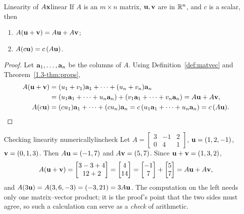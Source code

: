 \documentclass[11pt]{article}
\begin{document}
\begin{thm}{Linearity of $A\mathbf{x}$}{linear}
If $A$ is an $m\times n$ matrix, $\mathbf{u},\mathbf{v}$ are in $\mathbb{R}^n$, and $c$ is a scalar, then
\begin{enumerate}[label=(\alph*),itemsep=1pt]
  \item $A(\mathbf{u}+\mathbf{v})=A\mathbf{u}+A\mathbf{v}$;
  \item $A(c\mathbf{u})=c\,(A\mathbf{u})$.
\end{enumerate}
\end{thm}
 
\begin{proof}
Let $\mathbf{a}_1,\dots,\mathbf{a}_n$ be the columns of $A$. Using Definition~\ref{def:matvec} and Theorem~\ref{1.3-thm:props},
\begin{align*}
A(\mathbf{u}+\mathbf{v})&=(u_1+v_1)\mathbf{a}_1+\cdots+(u_n+v_n)\mathbf{a}_n\\
&=(u_1\mathbf{a}_1+\cdots+u_n\mathbf{a}_n)+(v_1\mathbf{a}_1+\cdots+v_n\mathbf{a}_n)=A\mathbf{u}+A\mathbf{v},\\
A(c\mathbf{u})&=(cu_1)\mathbf{a}_1+\cdots+(cu_n)\mathbf{a}_n=c\,(u_1\mathbf{a}_1+\cdots+u_n\mathbf{a}_n)=c\,(A\mathbf{u}).
\end{align*}
\end{proof}
 
\begin{exmp}{Checking linearity numerically}{lincheck}
Let $A=\begin{bmatrix}3&-1&2\\0&4&1\end{bmatrix}$, $\mathbf{u}=(1,2,-1)$, $\mathbf{v}=(0,1,3)$. Then $A\mathbf{u}=(-1,7)$ and $A\mathbf{v}=(5,7)$. Since
$\mathbf{u}+\mathbf{v}=(1,3,2)$,
\[
A(\mathbf{u}+\mathbf{v})=\begin{bmatrix}3-3+4\\12+2\end{bmatrix}=\begin{bmatrix}4\\14\end{bmatrix}=\begin{bmatrix}-1\\7\end{bmatrix}+\begin{bmatrix}5\\7\end{bmatrix}=A\mathbf{u}+A\mathbf{v},
\]
and $A(3\mathbf{u})=A(3,6,-3)=(-3,21)=3A\mathbf{u}$. The computation on the left needs only one matrix--vector product; it is the proof's
point that the two sides must agree, so such a calculation can serve as a \emph{check} of arithmetic.
\end{exmp}
 
\end{document}
